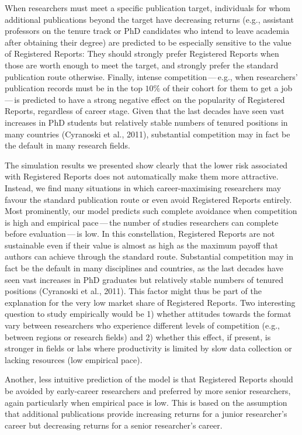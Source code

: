 \documentclass[
  ,man,mask,floatsintext]{apa6}
\begin{document}
When researchers must meet a specific publication target, individuals for whom additional publications beyond the target have decreasing returns (e.g., assistant professors on the tenure track or PhD candidates who intend to leave academia after obtaining their degree) are predicted to be especially sensitive to the value of Registered Reports:
They should strongly prefer Registered Reports when those are worth enough to meet the target, and strongly prefer the standard publication route otherwise.
Finally, intense competition\(\,\)---\(\,\)e.g., when researchers' publication records must be in the top \(10\%\) of their cohort for them to get a job\(\,\)---\(\,\)is predicted to have a strong negative effect on the popularity of Registered Reports, regardless of career stage.
Given that the last decades have seen vast increases in PhD students but relatively stable numbers of tenured positions in many countries (Cyranoski et al., 2011), substantial competition may in fact be the default in many research fields.

The simulation results we presented show clearly that the lower risk associated with Registered Reports does not automatically make them more attractive.
Instead, we find many situations in which career-maximising researchers may favour the standard publication route or even avoid Registered Reports entirely.
Most prominently, our model predicts such complete avoidance when competition is high and empirical pace\(\,\)---\(\,\)the number of studies researchers can complete before evaluation\(\,\)---\(\,\)is low.
In this constellation, Registered Reports are not sustainable even if their value is almost as high as the maximum payoff that authors can achieve through the standard route.
Substantial competition may in fact be the default in many disciplines and countries, as the last decades have seen vast increases in PhD graduates but relatively stable numbers of tenured positions (Cyranoski et al., 2011).
This factor might thus be part of the explanation for the very low market share of Registered Reports.
Two interesting question to study empirically would be 1) whether attitudes towards the format vary between researchers who experience different levels of competition (e.g., between regions or research fields) and 2) whether this effect, if present, is stronger in fields or labs where productivity is limited by slow data collection or lacking resources (low empirical pace).

Another, less intuitive prediction of the model is that Registered Reports should be avoided by early-career researchers and preferred by more senior researchers, again particularly when empirical pace is low.
This is based on the assumption that additional publications provide increasing returns for a junior researcher's career but decreasing returns for a senior researcher's career.
\end{document}

